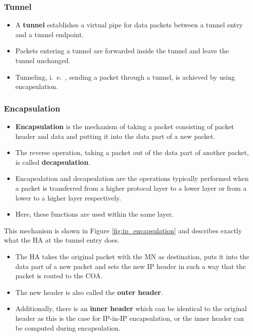 \subsubsection*{Tunnel}
\begin{multicols}{2}
	\begin{itemize}
		\item A \textbf{tunnel} establishes a virtual pipe for data packets between a tunnel entry and a tunnel endpoint. 
		\item Packets entering a tunnel are forwarded inside the tunnel and leave the tunnel unchanged. 
		\item Tunneling, i.\ e.\ , sending a packet through a tunnel, is achieved by using encapsulation.
	\end{itemize}
\end{multicols}


\subsubsection*{Encapsulation}
\begin{multicols}{2}
\begin{itemize}
	\item \textbf{Encapsulation} is the mechanism of taking a packet consisting of packet header and data and putting it into the data part of a new packet. 
	\item The reverse operation, taking a packet out of the data part of another packet, is called \textbf{decapsulation}. 
	\item Encapsulation and decapsulation are the operations typically performed when a packet is transferred from a higher protocol layer to a lower layer or from a lower to a higher layer respectively. 
	\item Here, these functions are used within the same layer.
\end{itemize}

\end{multicols}


This mechanism is shown in Figure {\ref{fig:ip_encapsulation}} and describes exactly what the HA at the tunnel entry does. 
\begin{multicols}{2}
	\begin{itemize}
		\item The HA takes the original packet with the MN as destination, puts it into the data part of a new packet and sets the new IP header in such a way that the packet is routed to the COA. 
		\item The new header is also called the \textbf{outer header}. 
		\item Additionally, there is an \textbf{inner header} which can be identical to the original header as this is the case for IP-in-IP encapsulation, or the inner header can be computed during encapsulation.
	\end{itemize}
\end{multicols}


